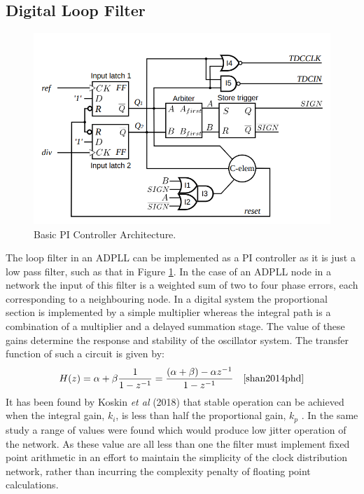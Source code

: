 \documentclass[11pt,english,british]{report}
\begin{document}
\subsection{Digital Loop Filter}
\begin{figure}[h]
	\centering
	\includegraphics[scale=0.35]{../shan_bb_pd} %
	\caption{Basic PI Controller Architecture.}
	\label{fig:my_simple_pi}
\end{figure}
The loop filter in an ADPLL can be implemented as a PI controller as it is just a low pass filter, such as that in Figure \ref{fig:my_simple_pi}. In the case of an ADPLL node in a network the input of this filter is a weighted sum of two to four phase errors, each corresponding to a neighbouring node. In a digital system the proportional section is implemented by a simple multiplier whereas the integral path is a combination of a multiplier and a delayed summation stage. The value of these gains determine the response and stability of the oscillator system. The transfer function of such a circuit is given by:
\begin{equation*}
	H(z) = \alpha + \beta\frac{1}{1-z^{-1}} = \frac{(\alpha + \beta) - \alpha z^{-1}}{1-z^{-1}}~~~\cite{shan2014phd}
\end{equation*}
It has been found by Koskin \textit{et al} (2018) that stable operation can be achieved when the integral gain, $k_i$, is less than half the proportional gain, $k_p$ \cite{koskin2018generation}. In the same study a range of values were found which would produce low jitter operation of the network. As these value are all less than one the filter must implement fixed point arithmetic in an effort to maintain the simplicity of the clock distribution network, rather than incurring the complexity penalty of floating point calculations.
\end{document}

